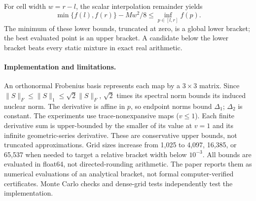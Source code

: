 For cell width $w=r-l$, the scalar interpolation remainder yields
\[
 \min\{f(l),f(r)\}-Mw^2/8\le\inf_{p\in[l,r]}f(p).
\]
The minimum of these lower bounds, truncated at zero, is a global lower bracket; the best evaluated point is an upper bracket. A candidate below the lower bracket beats every static mixture in exact real arithmetic.

\paragraph{Implementation and limitations.}
An orthonormal Frobenius basis represents each map by a $3\times3$ matrix. Since $\|S\|_F\le\|S\|_1\le\sqrt2\|S\|_F$, $\sqrt2$ times its spectral norm bounds its induced nuclear norm. The derivative is affine in $p$, so endpoint norms bound $\Delta_1$; $\Delta_2$ is constant. The experiments use trace-nonexpansive maps ($v\le1$). Each finite derivative sum is upper-bounded by the smaller of its value at $v=1$ and its infinite geometric-series derivative. These are conservative upper bounds, not truncated approximations. Grid sizes increase from 1,025 to 4,097, 16,385, or 65,537 when needed to target a relative bracket width below $10^{-3}$. All bounds are evaluated in float64, not directed-rounding arithmetic. The paper reports them as numerical evaluations of an analytical bracket, not formal computer-verified certificates. Monte Carlo checks and dense-grid tests independently test the implementation.
